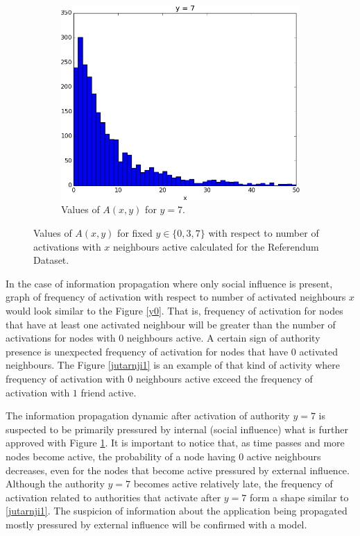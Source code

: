 \documentclass[times, utf8, zavrsni]{fer}
\begin{document}
\begin{figure}
\begin{subfigure}{\textwidth}
\centering
\includegraphics[scale=0.4]{034.png}
\caption{Values of $A(x, y)$ for $y=7$.}
\label{034}
\end{subfigure}
\caption{Values of $A(x,y)$ for fixed $y \in \{0, 3, 7\}$ with respect to number of activations with $x$ neighbours active calculated for the Referendum Dataset.}
\label{fig:test}
\end{figure}

In the  case of information propagation where only social influence is present, graph of frequency of activation with respect to number of activated neighbours $x$ would look similar to the Figure \ref{y0}. That is, frequency of activation for nodes that have at least one activated neighbour will be greater than the number of activations for nodes with $0$ neighbours active.  A certain sign of authority presence is unexpected frequency of activation for nodes that have $0$ activated neighbours. The Figure \ref{jutarnji1} is an example of that kind of activity where frequency of activation with $0$ neighbours active exceed the frequency of activation with $1$ friend active. 

The information propagation dynamic after activation of authority $y=7$ is suspected to be primarily pressured by internal (social influence) what is further approved with Figure \ref{034}. It is important to notice that, as time passes and more nodes become active, the probability of a node having $0$ active neighbours decreases, even for the nodes that become active pressured by external influence. Although the authority $y = 7$ becomes active relatively late, the frequency of activation related to authorities that activate after $y = 7$ form a shape similar to \ref{jutarnji1}. The suspicion of information about the application being propagated mostly pressured by external influence will be confirmed with a model.
\end{document}
